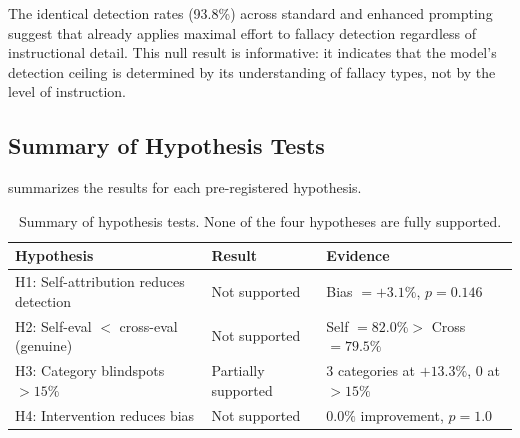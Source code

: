 The identical detection rates (93.8\%) across standard and enhanced prompting suggest that \gptfull already applies maximal effort to fallacy detection regardless of instructional detail. This null result is informative: it indicates that the model's detection ceiling is determined by its understanding of fallacy types, not by the level of instruction.

\subsection{Summary of Hypothesis Tests}

 summarizes the results for each pre-registered hypothesis.

\begin{table}[t]
    \centering
    \caption{Summary of hypothesis tests. None of the four hypotheses are fully supported.}
    \begin{tabular}{@{}p{5.5cm}lp{5cm}@{}}
        \toprule
        \textbf{Hypothesis} & \textbf{Result} & \textbf{Evidence} \\
        \midrule
        H1: Self-attribution reduces detection & Not supported & Bias $= +3.1\%$, $p = 0.146$ \\
        H2: Self-eval $<$ cross-eval (genuine) & Not supported & Self $= 82.0\% >$ Cross $= 79.5\%$ \\
        H3: Category blindspots $> 15\%$ & Partially supported & 3 categories at $+13.3\%$, 0 at $> 15\%$ \\
        H4: Intervention reduces bias & Not supported & $0.0\%$ improvement, $p = 1.0$ \\
        \bottomrule
    \end{tabular}
    \label{tab:hypotheses}
\end{table}
